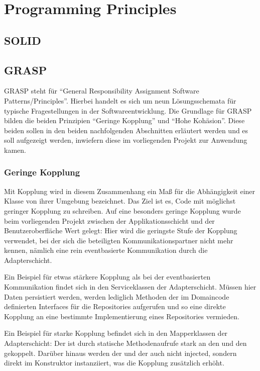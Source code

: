 \chapter{Programming Principles}

\section{SOLID}

\section{GRASP}
GRASP steht für \enquote{General Responsibility Assignment Software Patterns/Principles}. Hierbei handelt es sich um neun Lösungsschemata für typische Fragestellungen in der Softwareentwicklung. Die Grundlage für GRASP bilden die beiden Prinzipien \enquote{Geringe Kopplung} und \enquote{Hohe Kohäsion}. Diese beiden sollen in den beiden nachfolgenden Abschnitten erläutert werden und es soll aufgezeigt werden, inwiefern diese im vorliegenden Projekt zur Anwendung kamen.

\subsection{Geringe Kopplung}
Mit Kopplung wird in diesem Zusammenhang ein Maß für die Abhängigkeit einer Klasse von ihrer Umgebung bezeichnet. Das Ziel ist es, Code mit möglichst geringer Kopplung zu schreiben. Auf eine besonders geringe Kopplung wurde beim vorliegenden Projekt zwischen der Applikationsschicht und der Benutzeroberfläche Wert gelegt: Hier wird die geringste Stufe der Kopplung verwendet, bei der sich die beteiligten Kommunikationspartner nicht mehr kennen, nämlich eine rein eventbasierte Kommunikation durch die Adapterschicht.

Ein Beispiel für etwas stärkere Kopplung als bei der eventbasierten Kommunikation findet sich in den Serviceklassen der Adapterschicht. Müssen hier Daten persistiert werden, werden lediglich Methoden der im Domaincode definierten Interfaces für die Repositories aufgerufen und so eine direkte Kopplung an eine bestimmte Implementierung eines Repositories vermieden.

Ein Beispiel für starke Kopplung befindet sich in den Mapperklassen der Adapterschicht: Der  ist durch statische Methodenaufrufe stark an den  und den  gekoppelt. Darüber hinaus werden der  und der  auch nicht injected, sondern direkt im Konstruktor instanziiert, was die Kopplung zusätzlich erhöht.


